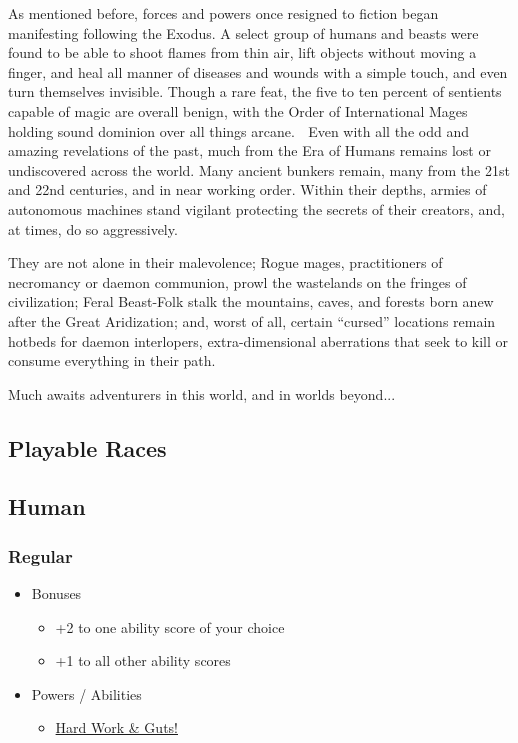 \documentclass[12pt, landscape]{article}
\begin{document}
\begin{FlushLeft}
\begin{multicols}{3}
			As mentioned before, forces and powers once resigned to fiction began manifesting following the Exodus. A select group of humans and beasts were found to be able to shoot flames from thin air, lift objects without moving a finger, and heal all manner of diseases and wounds with a simple touch, and even turn themselves invisible. Though a rare feat, the five to ten percent of sentients capable of magic are overall benign, with the Order of International Mages holding sound dominion over all things arcane. \vfill \null \columnbreak

			Even with all the odd and amazing revelations of the past, much from the Era of Humans remains lost or undiscovered across the world. Many ancient bunkers remain, many from the 21st and 22nd centuries, and in near working order. Within their depths, armies of autonomous machines stand vigilant protecting the secrets of their creators, and, at times, do so aggressively. \linebreak

			They are not alone in their malevolence; Rogue mages, practitioners of necromancy or daemon communion, prowl the wastelands on the fringes of civilization; Feral Beast-Folk stalk the mountains, caves, and forests born anew after the Great Aridization; and, worst of all, certain “cursed” locations remain hotbeds for daemon interlopers, extra-dimensional aberrations that seek to kill or consume everything in their path. \linebreak

			Much awaits adventurers in this world, and in worlds beyond...
			\vfill
			\pagebreak
		\end{multicols}

		\begin{multicols}{2}
			\section{Playable Races}
			\subsection{Human}
			\subsubsection{Regular}
			\begin{itemize}
				\item Bonuses
				\begin{itemize}
					\item +2 to one ability score of your choice
					\item +1 to all other ability scores
				\end{itemize}
				\item Powers  / Abilities
				\begin{itemize}
					\item \underline{Hard Work \& Guts!}


\end{itemize}
\end{itemize}
\end{multicols}
\end{FlushLeft}
\end{document}
